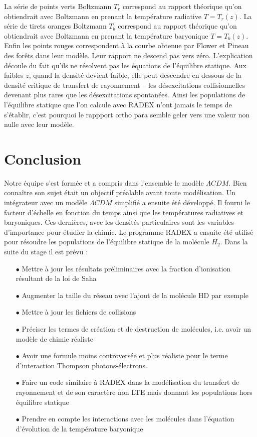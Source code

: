 \documentclass[10pt, a4paper]{report}
\numberwithin{equation}{subsection}
\begin{document}
La série de points verts Boltzmann $T_r$ correspond au rapport théorique qu'on obtiendrait avec Boltzmann en prenant la température radiative $T=T_r(z)$.
La série de tirets oranges Boltzmann $T_b$ correspond au rapport théorique qu'on obtiendrait avec Boltzmann en prenant la température baryonique $T=T_b(z)$.
Enfin les points rouges correspondent à la courbe obtenue par Flower et Pineau des forêts dans leur modèle. 
Leur rapport ne descend pas vers zéro. L'explication découle du fait qu'ils ne résolvent pas les équations de l'équilibre statique. Aux faibles $z$, quand la densité devient faible, elle peut descendre en dessous de la densité critique de transfert de rayonnement -- les désexcitations collisionnelles devenant plus rares que les désexcitations spontanées. Ainsi les populations de l'équilibre statique que l'on calcule avec RADEX n'ont jamais le temps de s'établir, c'est pourquoi le rappport ortho para semble geler vers une valeur non nulle avec leur modèle.

\chapter*{Conclusion}
Notre équipe s'est formée et a compris dans l'ensemble le modèle $\Lambda CDM$. Bien connaître son sujet était un objectif préalable avant toute modélisation. Un intégrateur avec un modèle $\Lambda CDM$ simplifié a ensuite été développé. Il fourni le facteur d'échelle en fonction du temps ainsi que les températures radiatives et baryoniques. Ces dernières, avec les densités particulaires sont les variables d'importance pour étudier la chimie. Le programme RADEX a ensuite été utilisé pour résoudre les populations de l'équilibre statique de la molécule $H_2$. Dans la suite du stage il est prévu :

\begin{itemize}
	\item [$\bullet$] Mettre à jour les résultats préliminaires avec la fraction d'ionisation résultant de la loi de Saha
	\item [$\bullet$] Augmenter la taille du réseau avec l'ajout de la molécule HD par exemple
	\item [$\bullet$] Mettre à jour les fichiers de collisions
	\item [$\bullet$] Préciser les termes de création et de destruction de molécules, i.e. avoir un modèle de chimie réaliste
	\item [$\bullet$] Avoir une formule moins controversée et plus réaliste pour le terme d'interaction Thompson photons-électrons. 
	\item [$\bullet$] Faire un code similaire à RADEX dans la modélisation du transfert de rayonnement et de son caractère non LTE mais donnant les populations hors équilibre statique
	\item [$\bullet$] Prendre en compte les interactions avec les molécules dans l'équation d'évolution de la température baryonique 
\end{itemize}
\end{document}

